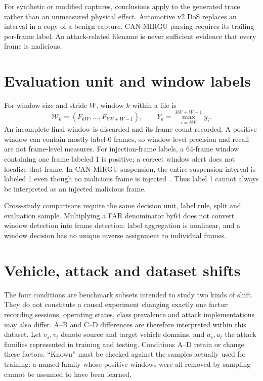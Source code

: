 \documentclass[12pt,a4paper,oneside,openany]{extbook}
\begin{document}
For synthetic or modified captures, conclusions apply to the generated trace rather than an unmeasured physical effect. Automotive v2 DoS replaces an interval in a copy of a benign capture. CAN-MIRGU parsing requires its trailing per-frame label. An attack-related filename is never sufficient evidence that every frame is malicious.

\section{Evaluation unit and window labels}
For window size and stride $W$, window $k$ within a file is
\begin{equation}
\mathcal W_k=(F_{kW},\ldots,F_{kW+W-1}),\qquad Y_k=\max_{i=kW}^{kW+W-1}y_i.
\end{equation}
An incomplete final window is discarded and its frame count recorded. A positive window can contain mostly label-0 frames, so window-level precision and recall are not frame-level measures. For injection-frame labels, a 64-frame window containing one frame labeled 1 is positive; a correct window alert does not localize that frame. In CAN-MIRGU suspension, the entire suspension interval is labeled 1 even though no malicious frame is injected~\cite{rajapaksha2024canmirgu}. Thus label 1 cannot always be interpreted as an injected malicious frame.

Cross-study comparisons require the same decision unit, label rule, split and evaluation sample. Multiplying a FAR denominator by64 does not convert window detection into frame detection: label aggregation is nonlinear, and a window decision has no unique inverse assignment to individual frames.

\section{Vehicle, attack and dataset shifts}

The four conditions are benchmark subsets intended to study two kinds of shift. They do not constitute a causal experiment changing exactly one factor: recording sessions, operating states, class prevalence and attack implementations may also differ. A--B and C--D differences are therefore interpreted within this dataset.
Let $v_s,v_t$ denote source and target vehicle domains, and $a_s,a_t$ the attack families represented in training and testing. Conditions A--D retain or change these factors. ``Known'' must be checked against the samples actually used for training: a named family whose positive windows were all removed by sampling cannot be assumed to have been learned.
\end{document}
